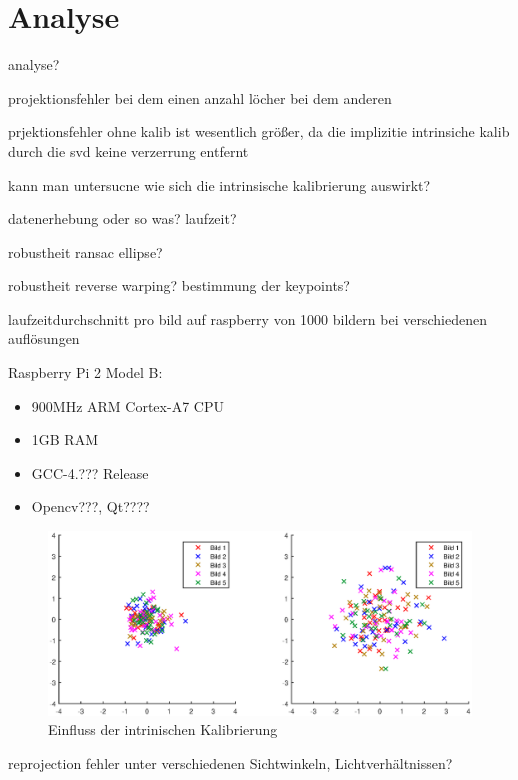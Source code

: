 \chapter{Analyse}
analyse?

projektionsfehler bei dem einen
anzahl löcher bei dem anderen

prjektionsfehler ohne kalib ist wesentlich größer, da die implizitie intrinsiche kalib durch die svd keine verzerrung entfernt

kann man untersucne wie sich die intrinsische kalibrierung auswirkt?

datenerhebung oder so was? laufzeit?

robustheit ransac ellipse?

robustheit reverse warping? bestimmung der keypoints?

laufzeitdurchschnitt pro bild  auf raspberry von 1000 bildern bei verschiedenen auflösungen

Raspberry Pi 2 Model B:
\begin{itemize}
	\item 900MHz ARM Cortex-A7 CPU
	\item 1GB RAM
	\item GCC-4.??? Release
	\item Opencv???, Qt????
\end{itemize}


\begin{figure}[!htb]
	\centering
	\includegraphics[width=\textwidth]{images/reprojectionErrorReverse.eps}
	\caption{Einfluss der intrinischen Kalibrierung}
	\label{fig:influenceOfCalib}
\end{figure}

reprojection fehler unter verschiedenen Sichtwinkeln, Lichtverhältnissen?